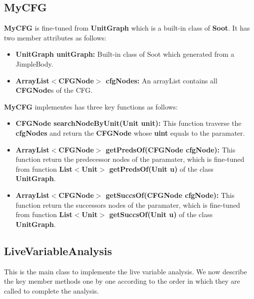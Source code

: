 \documentclass[conference]{IEEEtran}
\begin{document}
\subsection{MyCFG}
\textbf{MyCFG} is fine-tuned from \textbf{UnitGraph} which is a built-in class of \textbf{Soot}.
It has two member attributes as follows:

\begin{itemize}
    \item \textbf{UnitGraph unitGraph: } Built-in class of Soot which generated from a JimpleBody.
    \item \textbf{ArrayList$<$CFGNode$>$ cfgNodes: } An arrayList contains all \textbf{CFGNode}s of the CFG.
\end{itemize}

\textbf{MyCFG} implementes has three key functions as follows:
\begin{itemize}
    \item \textbf{CFGNode searchNodeByUnit(Unit unit): } This function traverse the \textbf{cfgNodes} and return the \textbf{CFGNode} whose \textbf{uint} equals to the paramater.
    \item \textbf{ArrayList$<$CFGNode$>$ getPredsOf(CFGNode cfgNode): } This function return the predecessor nodes of the paramater, which is fine-tuned from function \textbf{List$<$Unit$>$ getPredsOf(Unit u)} of the class \textbf{UnitGraph}.
    \item \textbf{ArrayList$<$CFGNode$>$ getSuccsOf(CFGNode cfgNode): } This function return the successors nodes of the paramater, which is fine-tuned from function \textbf{List$<$Unit$>$ getSuccsOf(Unit u)} of the class \textbf{UnitGraph}.
\end{itemize}

\subsection{LiveVariableAnalysis}
This is the main class to implemente the live variable analysis. 
We now describe the key member methods one by one according to the order in which they are called to complete the analysis.
\end{document}

